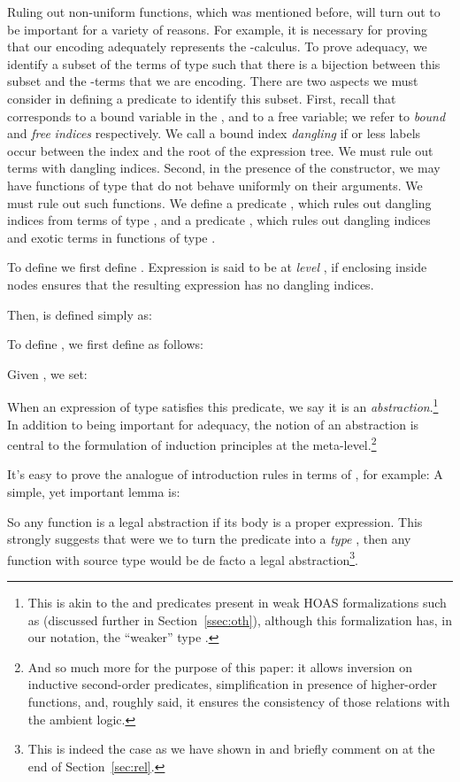 \documentclass[final]{svjour3}
\begin{document}
Ruling out non-uniform functions, which was mentioned before, will
turn out to be important for a variety of reasons.  For example, it is
necessary for proving that our encoding adequately represents the
-calculus.  To prove adequacy, we identify a subset of the
terms of type  such that there is a bijection between this
subset and the -terms that we are encoding.  There are two
aspects we must consider in defining a predicate to identify this
subset.  First, recall that  corresponds to a bound variable
in the \lcalc, and  to a free variable; we refer to
\emph{bound} and \emph{free} \emph{indices} respectively. We call a
bound index  \emph{dangling} if  or less  labels
occur between the index  and the root of the expression tree.  We
must rule out terms with dangling indices.  Second, in the presence of
the  constructor, we may have functions of type
 that do not behave uniformly on their arguments.  We
must rule out such functions.  We define a predicate ,
which rules out dangling indices from terms of type , and a
predicate , which rules out dangling indices and exotic
terms in functions of type .

To define  we first define .  Expression
 is said to be at \emph{level} , if enclosing 
inside   nodes ensures that the resulting expression
has no dangling indices.
 
Then,  is defined simply as:


To define , we first define   as follows:
 
Given  , 
we set:

When an expression  of type  satisfies this
predicate, we say it is an \emph{abstraction}.\footnote{This is akin
to the  and  predicates present in weak
HOAS formalizations such as \cite{DFHtlca95} (discussed further in
Section~\ref{ssec:oth}), although this formalization has,
in our notation, the ``weaker'' type
.}  In addition to being
important for adequacy, the notion of an abstraction is central to the
formulation of induction principles at the meta-level.\footnote{And
so much more for the purpose of this paper: it allows inversion on
inductive second-order predicates, simplification in presence of
higher-order functions, and, roughly said, it ensures the consistency of
those relations with the ambient logic.}

It's easy to prove the analogue of  introduction rules in
terms of , for example:
 A simple, yet
important lemma is:
\begin{mclemma}
  
\label{mclem:proper_abst}
\end{mclemma}
So any function is a legal abstraction if its body is a proper
expression. This strongly suggests that were we to turn the predicate
 into a \emph{type} , then any function with source type
 would be de facto a legal
abstraction\footnote{This is indeed the case as we have shown in
  \cite{MMF07} and briefly comment on at the end of
  Section~\ref{sec:rel}.}.
\end{document}
